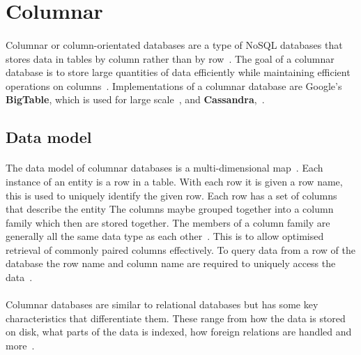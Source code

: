 \documentclass{CRPITStyle}
\renewcommand{\cite}{\citep}
\begin{document}



\section{Columnar}

\paragraph{}
Columnar or column-orientated databases are a type of NoSQL databases that
stores data in tables by column rather than by row~\cite{nosql_survey}.
The goal of a columnar database is to store large quantities of data efficiently
while maintaining efficient operations on columns~\cite{nosql_survey,nosql_eval}.
Implementations of a columnar database are Google's
\textbf{BigTable}, which is used for large scale~\cite{bigtable}, and
\textbf{Cassandra},~\cite{cassandra}.

\subsection{Data model}

\paragraph{}
The data model of columnar databases is a multi-dimensional
map~\cite{bigtable,nosql_eval}.
Each instance of an entity is a row in a table.
With each row it is given a row name, this is used to uniquely identify the
given row.
Each row has a set of columns that describe the entity
The columns maybe grouped together into a column family which then are
stored together.
The members of a column family are generally all the same data type as each
other~\cite{bigtable}.
This is to allow optimised retrieval of commonly paired columns effectively.
To query data from a row of the database the row name and column name are
required to uniquely access the data~\cite{bigtable}.

\paragraph{}
Columnar databases are similar to relational databases but has some key
characteristics that differentiate them.
These range from how the data is stored on disk, what parts of the
data is indexed, how foreign relations are handled and more~\cite{nosql_survey}.
\end{document}
